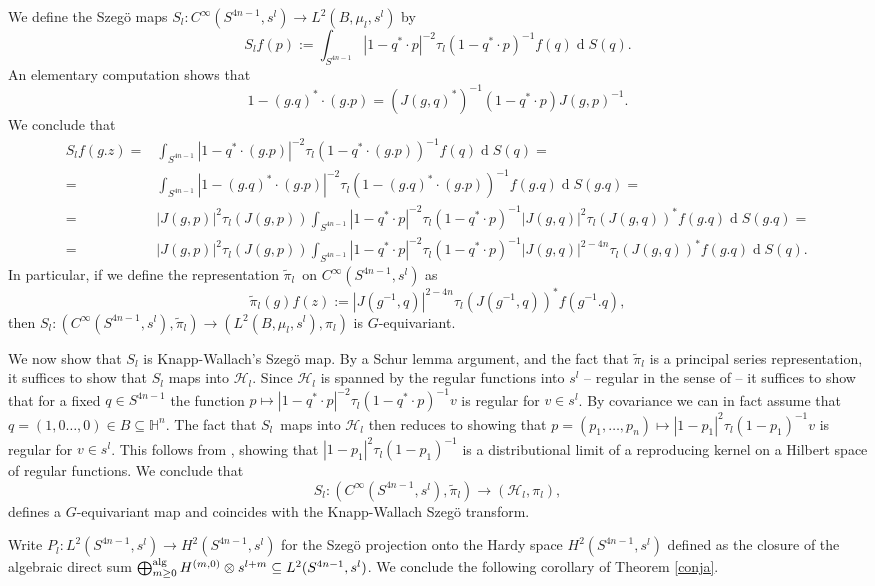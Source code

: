 \documentclass[a4paper,reqno]{amsart}
\numberwithin{equation}{section}
\def\rd{\operatorname{d}\!}
\theoremstyle{definition}
\theoremstyle{remark}
\begin{document}
We define the Szegö maps $S_l:C^\infty(S^{4n-1},s^l)\to  L^2(B,\mu_l,s^l)$ by 
$$S_lf(p):=\int_{S^{4n-1}} |1-q^*\cdot p|^{-2}\tau_l(1-q^*\cdot p)^{-1} f(q)\rd S(q).$$
An elementary computation shows that 
$$1-(g.q)^*\cdot (g.p)=(J(g,q)^*)^{-1}(1-q^*\cdot p)J(g,p)^{-1}.$$
We conclude that 
\begin{align*}
S_lf(g.z)=&\int_{S^{4n-1}} |1-q^*\cdot(g.p)|^{-2}\tau_l(1-q^*\cdot (g.p))^{-1} f(q)\rd S(q)=\\
=&\int_{S^{4n-1}} |1-(g.q)^*\cdot(g.p)|^{-2}\tau_l(1-(g.q)^*\cdot (g.p))^{-1} f(g.q)\rd S(g.q)=\\
=&|J(g,p)|^{2}\tau_l(J(g,p))\int_{S^{4n-1}}  |1-q^*\cdot p|^{-2}\tau_l(1-q^*\cdot p)^{-1} |J(g,q)|^{2}\tau_l(J(g,q))^*f(g.q)\rd S(g.q)=\\
=&|J(g,p)|^{2}\tau_l(J(g,p))\int_{S^{4n-1}}  |1-q^*\cdot p|^{-2}\tau_l(1-q^*\cdot p)^{-1} |J(g,q)|^{2-4n}\tau_l(J(g,q))^*f(g.q)\rd S(q).
\end{align*}
In particular, if we define the representation $\tilde{\pi}_l$ on $C^\infty(S^{4n-1},s^l)$ as
$$\tilde{\pi}_l(g)f(z):=|J(g^{-1},q)|^{2-4n}\tau_l(J(g^{-1},q))^*f(g^{-1}.q),$$
then $S_l:(C^\infty(S^{4n-1},s^l),\tilde{\pi}_l)\to (L^2(B,\mu_l,s^l),\pi_l)$ is $G$-equivariant.

We now show that $S_l$ is Knapp-Wallach's Szegö map. By a Schur lemma argument, and the fact that $\tilde{\pi}_l$ is a principal series representation, it suffices to show that $S_l$ maps into $\mathcal{H}_l$. Since $\mathcal{H}_l$ is spanned by the regular functions into $s^l$ -- regular in the sense of \cite[Section 2.3]{liuzhang} -- it suffices to show that for a fixed $q\in S^{4n-1}$ the function $p\mapsto   |1-q^*\cdot p|^{-2}\tau_l(1-q^*\cdot p)^{-1}v$ is regular for $v\in s^l$. By covariance we can in fact assume that $q=(1,0\ldots, 0)\in B\subseteq \mathbb{H}^n$. The fact that $S_l$ maps into $\mathcal{H}_l$ then reduces to showing that $p=(p_1,\ldots, p_n)\mapsto |1-p_1|^{2}\tau_l(1-p_1)^{-1}v$ is regular for $v\in s^l$. This follows from \cite[Theorem 3.11]{liuzhang}, showing that $|1-p_1|^{2}\tau_l(1-p_1)^{-1}$ is a distributional limit of a reproducing kernel on a Hilbert space of regular functions. We conclude that 
$$S_l:(C^\infty(S^{4n-1},s^l),\tilde{\pi}_l)\to (\mathcal{H}_l,\pi_l),$$ defines a $G$-equivariant map and coincides with the Knapp-Wallach Szegö transform.

Write $P_l:L^2(S^{4n-1},s^l)\to H^2(S^{4n-1},s^l)$ for the Szegö projection onto the Hardy space $H^2(S^{4n-1},s^l)$ defined as the closure of the algebraic direct sum $\bigoplus_{m\geq 0}^{\rm alg} H^{(m,0)}\otimes s^{l+m}\subseteq L^2(S^{4n-1},s^l)$. We conclude the following corollary of Theorem \ref{conja}.
\end{document}
